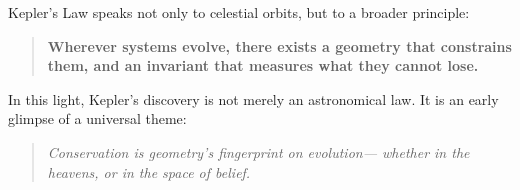 \begin{tcolorbox}[colback=gray!5!white, colframe=gray!50!black, title={Summary}]
Kepler’s Law speaks not only to celestial orbits,  
but to a broader principle:

\begin{quote}
\textbf{Wherever systems evolve, there exists a geometry that constrains them,  
and an invariant that measures what they cannot lose.}
\end{quote}
\end{tcolorbox}

In this light, Kepler’s discovery is not merely an astronomical law.  
It is an early glimpse of a universal theme:

\begin{quote}
\textit{Conservation is geometry’s fingerprint on evolution—  
whether in the heavens, or in the space of belief.}
\end{quote}

